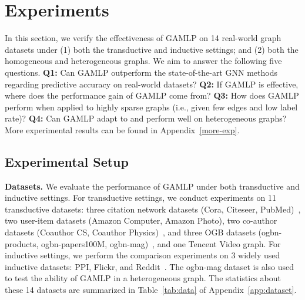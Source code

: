 \documentclass[sigconf]{acmart}
\newcommand{\sys}{\textsc{GAMLP}\xspace}
\begin{document}
\section{Experiments}

In this section, we verify the effectiveness of GAMLP on 14 real-world graph datasets under (1) both the transductive and inductive settings; and (2) both the homogeneous and heterogeneous graphs.
We aim to answer the following five questions. 
\textbf{Q1:} Can GAMLP outperform the state-of-the-art GNN methods regarding predictive accuracy on real-world datasets?
\textbf{Q2:} If \sys is effective, where does the performance gain of GAMLP come from?
\textbf{Q3:} How does GAMLP perform when applied to highly sparse graphs (i.e., given few edges and low label rate)? 
\textbf{Q4:} Can GAMLP adapt to and perform well on heterogeneous graphs?
More experimental results can be found in Appendix~\ref{more-exp}.


\subsection{Experimental Setup}
\label{sec:settings}



\textbf{Datasets.}
We evaluate the performance of GAMLP under both transductive and inductive settings.
For transductive settings, we conduct experiments on 11 transductive datasets: three citation network datasets (Cora, Citeseer, PubMed)~\citep{DBLP:journals/aim/SenNBGGE08}, two user-item datasets (Amazon Computer, Amazon Photo), two co-author datasets (Coauthor CS, Coauthor Physics)~\citep{shchur2018pitfalls}, and three OGB datasets (ogbn-products, ogbn-papers100M, ogbn-mag)~\citep{hu2021ogb}, and one Tencent Video graph.
For inductive settings, we perform the comparison experiments on 3 widely used inductive datasets: PPI, Flickr, and Reddit~\citep{DBLP:conf/iclr/ZengZSKP20}.
The ogbn-mag dataset is also used to test the ability of \sys in a heterogeneous graph.
The statistics about these 14 datasets are summarized in Table~\ref{tab:data} of Appendix~\ref{app:dataset}.
\end{document}
